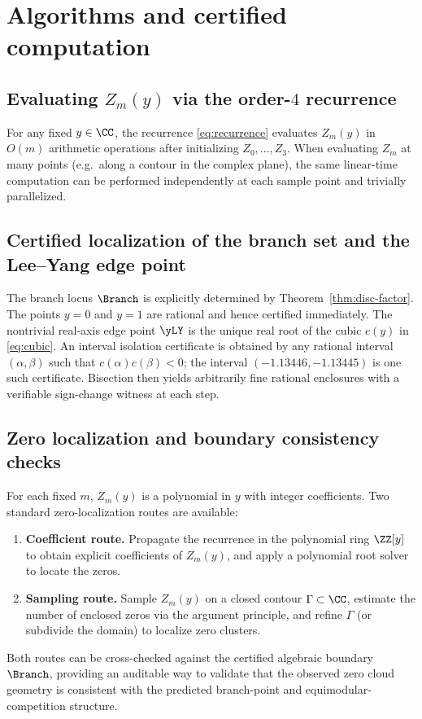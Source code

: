 \section{Algorithms and certified computation}\label{sec:algo}

\subsection{Evaluating \texorpdfstring{\(Z_m(y)\)}{Z\_m(y)} via the order-\texorpdfstring{\(4\)}{4} recurrence}

For any fixed \(y\in\CC\), the recurrence \eqref{eq:recurrence} evaluates \(Z_m(y)\) in \(O(m)\) arithmetic operations after initializing \(Z_0,\dots,Z_3\).
When evaluating \(Z_m\) at many points (e.g.\ along a contour in the complex plane), the same linear-time computation can be performed independently at each sample point and trivially parallelized.

\subsection{Certified localization of the branch set and the Lee--Yang edge point}

The branch locus \(\Branch\) is explicitly determined by Theorem~\ref{thm:disc-factor}.
The points \(y=0\) and \(y=1\) are rational and hence certified immediately.
The nontrivial real-axis edge point \(\yLY\) is the unique real root of the cubic \(c(y)\) in \eqref{eq:cubic}.
An interval isolation certificate is obtained by any rational interval \((\alpha,\beta)\) such that \(c(\alpha)c(\beta)<0\); the interval \((-1.13446,-1.13445)\) is one such certificate.
Bisection then yields arbitrarily fine rational enclosures with a verifiable sign-change witness at each step.

\subsection{Zero localization and boundary consistency checks}

For each fixed \(m\), \(Z_m(y)\) is a polynomial in \(y\) with integer coefficients.
Two standard zero-localization routes are available:
\begin{enumerate}
  \item \textbf{Coefficient route.} Propagate the recurrence in the polynomial ring \(\ZZ[y]\) to obtain explicit coefficients of \(Z_m(y)\), and apply a polynomial root solver to locate the zeros.
  \item \textbf{Sampling route.} Sample \(Z_m(y)\) on a closed contour \(\Gamma\subset\CC\), estimate the number of enclosed zeros via the argument principle, and refine \(\Gamma\) (or subdivide the domain) to localize zero clusters.
\end{enumerate}
Both routes can be cross-checked against the certified algebraic boundary \(\Branch\), providing an auditable way to validate that the observed zero cloud geometry is consistent with the predicted branch-point and equimodular-competition structure.

